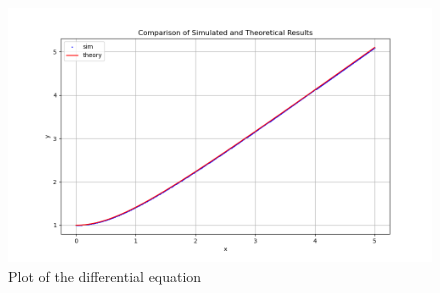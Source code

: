 \documentclass[journal]{IEEEtran}
\begin{document}
\begin{figure}[h]
    \centering
    \includegraphics[width=\columnwidth]{figs/Figure_1}
    \caption{Plot of the differential equation }
    \label{fig:Plot}
    \end{figure}
\end{document}
